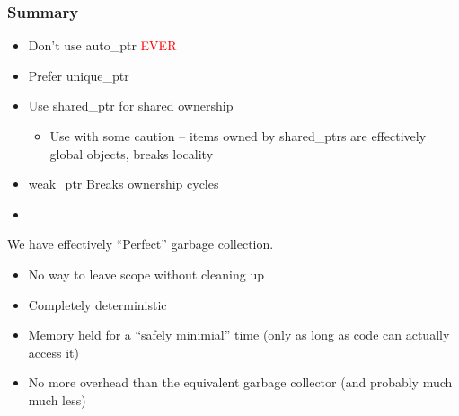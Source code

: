 
\begin{frame}[fragile,t]
\frametitle{Summary}

\begin{itemize}
\item Don't use auto\_ptr \textcolor{red}{EVER}
\pause{}
\item Prefer unique\_ptr
\pause{}
\item Use shared\_ptr for shared ownership
\begin{itemize}
  \item Use with some caution -- items owned by shared\_ptrs are
    effectively global objects, breaks locality
\end{itemize}
\pause{}
\item weak\_ptr Breaks ownership cycles
\pause{}
\item {}
\end{itemize}
\vskip 12pt
\pause{}

We have effectively ``Perfect'' garbage collection.
\begin{itemize}
\item No way to leave scope without cleaning up
\item Completely deterministic
\item Memory held for a ``safely minimial'' time (only as long as code can
  actually access it)
\item No more overhead than the equivalent garbage collector (and
  probably much much less)
\end{itemize}

\end{frame}
















